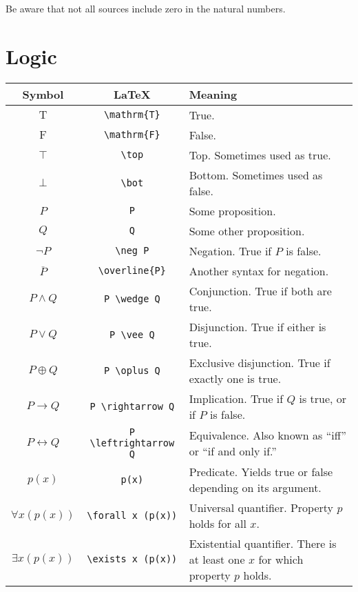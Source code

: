\documentclass{article}
\begin{document}
Be aware that not all sources include zero in the natural numbers.


\section{Logic}

\renewcommand{\arraystretch}{1.2}
\begin{tabularx}{\textwidth}{ccX}
    Symbol & \LaTeX & Meaning \\
    \hline
    $\mathrm{T}$ & \texttt{{\textbackslash}mathrm\{T\}} & True. \\
    $\mathrm{F}$ & \texttt{{\textbackslash}mathrm\{F\}} & False. \\
    $\top$ & \texttt{{\textbackslash}top} & Top. Sometimes used as true. \\
    $\bot$ & \texttt{{\textbackslash}bot} & Bottom. Sometimes used as false. \\
    $P$ & \texttt{P} & Some proposition. \\
    $Q$ & \texttt{Q} & Some other proposition. \\
    $\neg P$ & \texttt{{\textbackslash}neg P} & Negation. True if $P$ is false. \\
    $\overline{P}$ & \texttt{{\textbackslash}overline\{P\}} & Another syntax for negation. \\
    $P \wedge Q$ & \texttt{P {\textbackslash}wedge Q} & Conjunction. True if both are true. \\
    $P \vee Q$ & \texttt{P {\textbackslash}vee Q} & Disjunction. True if either is true. \\
    $P \oplus Q$ & \texttt{P {\textbackslash}oplus Q} & Exclusive disjunction. True if exactly one is true. \\
    $P \rightarrow Q$ & \texttt{P {\textbackslash}rightarrow Q} & Implication. True if $Q$ is true, or if $P$ is false. \\
    $P \leftrightarrow Q$ & \texttt{P {\textbackslash}leftrightarrow Q} & Equivalence. Also known as ``iff'' or ``if and only if.'' \\
    $p(x)$ & \texttt{p(x)} & Predicate. Yields true or false depending on its argument. \\
    $\forall x (p(x))$ & \texttt{{\textbackslash}forall x (p(x))} & Universal quantifier. Property $p$ holds for all $x$. \\
    $\exists x (p(x))$ & \texttt{{\textbackslash}exists x (p(x))} & Existential quantifier. There is at least one $x$ for which property $p$ holds. \\

\end{tabularx}
\end{document}
